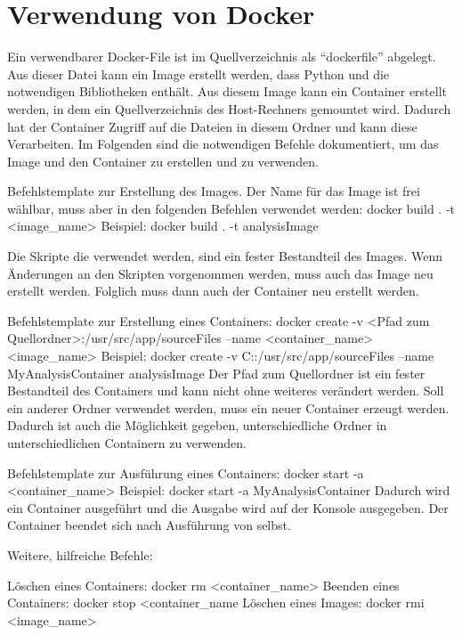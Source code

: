 \section{Verwendung von Docker}
\label{docker:examples}

Ein verwendbarer Docker-File ist im Quellverzeichnis als \enquote{dockerfile} abgelegt.
Aus dieser Datei kann ein Image erstellt werden, dass Python und die notwendigen Bibliotheken enthält.
Aus diesem Image kann ein Container erstellt werden, in dem ein Quellverzeichnis des Host-Rechners gemountet wird.
Dadurch hat der Container Zugriff auf die Dateien in diesem Ordner und kann diese Verarbeiten.
Im Folgenden sind die notwendigen Befehle dokumentiert, um das Image und den Container zu erstellen und zu verwenden.
{}{}
	
\begin{DockerCommands}
Befehlstemplate zur Erstellung des Images. Der Name für das Image ist frei wählbar,
muss aber in den folgenden Befehlen verwendet werden:
	docker build . -t <image_name>
Beispiel:
	docker build . -t analysisImage
	
Die Skripte die verwendet werden, sind ein fester Bestandteil des Images.
Wenn Änderungen an den Skripten vorgenommen werden, muss auch das Image neu erstellt
werden.
Folglich muss dann auch der Container neu erstellt werden.
		
Befehlstemplate zur Erstellung eines Containers:
	docker create  -v <Pfad zum Quellordner>:/usr/src/app/sourceFiles  --name <container_name>  <image_name>
Beispiel:	
	docker create  -v C:\Temp\sourcefiles:/usr/src/app/sourceFiles  --name MyAnalysisContainer  analysisImage
Der Pfad zum Quellordner ist ein fester Bestandteil des Containers und kann nicht
ohne weiteres verändert werden.
Soll ein anderer Ordner verwendet werden, muss ein neuer Container erzeugt werden.
Dadurch ist auch die Möglichkeit gegeben, unterschiedliche Ordner in 
unterschiedlichen Containern zu verwenden.

Befehlstemplate zur Ausführung eines Containers:
	docker start -a <container_name>
Beispiel:
	docker start -a MyAnalysisContainer
Dadurch wird ein Container ausgeführt und die Ausgabe wird auf der Konsole 
ausgegeben. Der Container beendet sich nach Ausführung von selbst.



Weitere, hilfreiche Befehle:

Löschen eines Containers:
	docker rm <container_name>
Beenden eines Containers:
	docker stop <container_name
Löschen eines Images:
	docker rmi <image_name>
\end{DockerCommands}